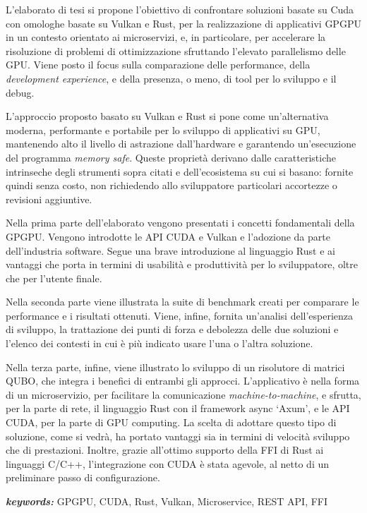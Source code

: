 
L'elaborato di tesi si propone l'obiettivo di confrontare soluzioni basate su Cuda con omologhe basate su Vulkan e Rust, per la realizzazione di applicativi GPGPU in un contesto orientato ai microservizi, e, in particolare, per accelerare la risoluzione di problemi di ottimizzazione sfruttando l'elevato parallelismo delle GPU. Viene posto il focus sulla comparazione delle performance, della \textit{development experience}, e della presenza, o meno, di tool per lo sviluppo e il debug.

L'approccio proposto basato su Vulkan e Rust si pone come un'alternativa moderna, performante e portabile per lo sviluppo di applicativi su GPU, mantenendo alto il livello di astrazione dall'hardware e garantendo un'esecuzione del programma \textit{memory safe}. Queste proprietà derivano dalle caratteristiche intrinseche degli strumenti sopra citati e dell'ecosistema su cui si basano: fornite quindi senza costo, non richiedendo allo sviluppatore particolari accortezze o revisioni aggiuntive.

Nella prima parte dell'elaborato vengono presentati i concetti fondamentali della GPGPU. Vengono introdotte le API CUDA e Vulkan e l'adozione da parte dell'industria software. Segue una brave introduzione al linguaggio Rust e ai vantaggi che porta in termini di usabilità e produttività per lo sviluppatore, oltre che per l'utente finale.

Nella seconda parte viene illustrata la suite di benchmark creati per comparare le performance e i risultati ottenuti. Viene, infine, fornita un'analisi dell'esperienza di sviluppo, la trattazione dei punti di forza e debolezza delle due soluzioni e l'elenco dei contesti in cui è più indicato usare l'una o l'altra soluzione.

Nella terza parte, infine, viene illustrato lo sviluppo di un risolutore di matrici QUBO, che integra i benefici di entrambi gli approcci. L'applicativo è nella forma di un microservizio, per facilitare la comunicazione \textit{machine-to-machine}, e sfrutta, per la parte di rete, il linguaggio Rust con il framework async `Axum', e le API CUDA, per la parte di GPU computing. La scelta di adottare questo tipo di soluzione, come si vedrà, ha portato vantaggi sia in termini di velocità sviluppo che di prestazioni. Inoltre, grazie all'ottimo supporto della FFI di Rust ai linguaggi C/C++, l'integrazione con CUDA è stata agevole, al netto di un preliminare passo di configurazione.

\bigskip

\textit{\textbf{keywords:}} GPGPU, CUDA, Rust, Vulkan, Microservice, REST API, FFI